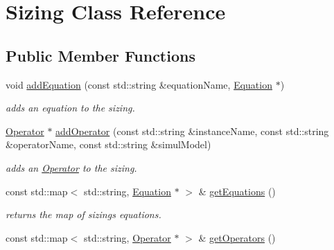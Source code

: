 \hypertarget{class_open_chams_1_1_sizing}{}\section{Sizing Class Reference}
\label{class_open_chams_1_1_sizing}
\subsection*{Public Member Functions}
\begin{DoxyCompactItemize}
\item 
void \mbox{\hyperlink{class_open_chams_1_1_sizing_a01f8823628bb567d1c463c8bef314ca7}{add\+Equation}} (const std\+::string \&equation\+Name, \mbox{\hyperlink{class_open_chams_1_1_equation}{Equation}} $\ast$)
\begin{DoxyCompactList}\small\item\em adds an equation to the sizing. \end{DoxyCompactList}\item 
\mbox{\hyperlink{class_open_chams_1_1_operator}{Operator}} $\ast$ \mbox{\hyperlink{class_open_chams_1_1_sizing_a712e045c11e463cff8411b3d0fd7f732}{add\+Operator}} (const std\+::string \&instance\+Name, const std\+::string \&operator\+Name, const std\+::string \&simul\+Model)
\begin{DoxyCompactList}\small\item\em adds an \mbox{\hyperlink{class_open_chams_1_1_operator}{Operator}} to the sizing. \end{DoxyCompactList}\item 
\mbox{\label{class_open_chams_1_1_sizing_aacce59a91d7919a2025c8611184d5bf3}} 
const std\+::map$<$ std\+::string, \mbox{\hyperlink{class_open_chams_1_1_equation}{Equation}} $\ast$ $>$ \& \mbox{\hyperlink{class_open_chams_1_1_sizing_aacce59a91d7919a2025c8611184d5bf3}{get\+Equations}} ()
\begin{DoxyCompactList}\small\item\em returns the map of sizing\textquotesingle{}s equations. \end{DoxyCompactList}\item 
\mbox{\label{class_open_chams_1_1_sizing_ad35c9083b30dac45186f4f0eb49b435d}} 
const std\+::map$<$ std\+::string, \mbox{\hyperlink{class_open_chams_1_1_operator}{Operator}} $\ast$ $>$ \& \mbox{\hyperlink{class_open_chams_1_1_sizing_ad35c9083b30dac45186f4f0eb49b435d}{get\+Operators}} ()

\end{DoxyCompactItemize}
